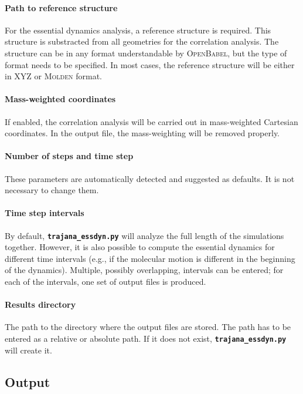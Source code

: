 \documentclass[a4paper,10pt,DIV=15,openany]{scrbook}
\newcommand{\ttt}[1]{\textbf{\texttt{#1}}}
\begin{document}
\paragraph{Path to reference structure}

For the essential dynamics analysis, a reference structure is required. This structure is substracted from all geometries for the correlation analysis.
The structure can be in any format understandable by \textsc{OpenBabel}, but the type of format needs to be specified.
In most cases, the reference structure will be either in XYZ or \textsc{Molden} format.

\paragraph{Mass-weighted coordinates}

If enabled, the correlation analysis will be carried out in mass-weighted Cartesian coordinates.
In the output file, the mass-weighting will be removed properly.

\paragraph{Number of steps and time step}

These parameters are automatically detected and suggested as defaults.
It is not necessary to change them.

\paragraph{Time step intervals}

By default, \ttt{trajana\_essdyn.py} will analyze the full length of the simulations together. 
However, it is also possible to compute the essential dynamics for different time intervals (e.g., if the molecular motion is different in the beginning of the dynamics).
Multiple, possibly overlapping, intervals can be entered; for each of the intervals, one set of output files is produced.

\paragraph{Results directory}

The path to the directory where the output files are stored.
The path has to be entered as a relative or absolute path.
If it does not exist, \ttt{trajana\_essdyn.py} will create it.

\subsection{Output}
\end{document}
